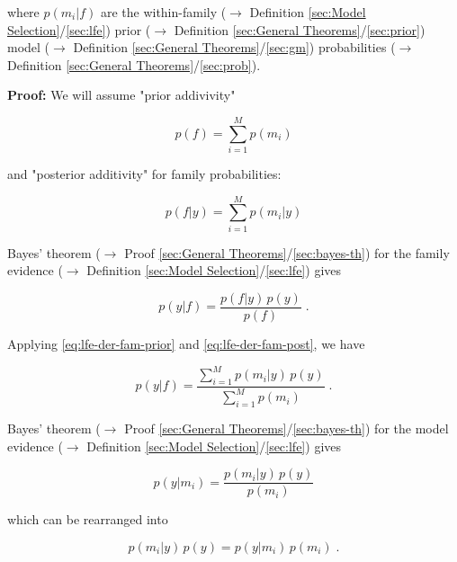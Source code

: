 \documentclass[a4paper,12pt,twoside]{book}
\begin{document}
where $p(m_i \vert f)$ are the within-family ($\rightarrow$ Definition \ref{sec:Model Selection}/\ref{sec:lfe}) prior ($\rightarrow$ Definition \ref{sec:General Theorems}/\ref{sec:prior}) model ($\rightarrow$ Definition \ref{sec:General Theorems}/\ref{sec:gm}) probabilities ($\rightarrow$ Definition \ref{sec:General Theorems}/\ref{sec:prob}).


\vspace{1em}
\textbf{Proof:} We will assume "prior addivivity"

\begin{equation} \label{eq:lfe-der-fam-prior}
p(f) = \sum_{i=1}^M p(m_i)
\end{equation}

and "posterior additivity" for family probabilities:

\begin{equation} \label{eq:lfe-der-fam-post}
p(f|y) = \sum_{i=1}^M p(m_i|y)
\end{equation}

Bayes' theorem ($\rightarrow$ Proof \ref{sec:General Theorems}/\ref{sec:bayes-th}) for the family evidence ($\rightarrow$ Definition \ref{sec:Model Selection}/\ref{sec:lfe}) gives

\begin{equation} \label{eq:lfe-der-fe-bayes-th}
p(y|f) = \frac{p(f|y) \, p(y)}{p(f)} \; .
\end{equation}

Applying \eqref{eq:lfe-der-fam-prior} and \eqref{eq:lfe-der-fam-post}, we have

\begin{equation} \label{eq:lfe-der-fe-me}
p(y|f) = \frac{\sum_{i=1}^M p(m_i|y) \, p(y)}{\sum_{i=1}^M p(m_i)} \; .
\end{equation}

Bayes' theorem ($\rightarrow$ Proof \ref{sec:General Theorems}/\ref{sec:bayes-th}) for the model evidence ($\rightarrow$ Definition \ref{sec:Model Selection}/\ref{sec:lfe}) gives

\begin{equation} \label{eq:lfe-der-me-bayes-th}
p(y|m_i) = \frac{p(m_i|y) \, p(y)}{p(m_i)}
\end{equation}

which can be rearranged into

\begin{equation} \label{eq:lfe-der-me-bayes-th-dev}
p(m_i|y) \, p(y) = p(y|m_i) \, p(m_i) \; .
\end{equation}
\end{document}
